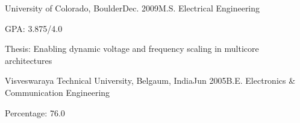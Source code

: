 \begin{rSubsection}{University of Colorado, Boulder}{Dec. 2009}{M.S. Electrical Engineering}{}
\item GPA: 3.875/4.0
\item Thesis: Enabling dynamic voltage and frequency scaling in multicore architectures
\end{rSubsection}

\begin{rSubsection}{Visveswaraya Technical University, Belgaum, India}{Jun 2005}{B.E. Electronics \& Communication Engineering}{}
\item Percentage: 76.0
\end{rSubsection}
